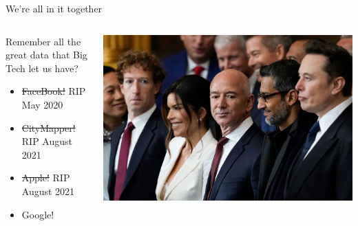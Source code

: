 \documentclass[
  ignorenonframetext,
]{beamer}
\providecommand{\tightlist}{%
  \setlength{\itemsep}{0pt}\setlength{\parskip}{0pt}}\usepackage{longtable,booktabs,array}
\begin{document}
\begin{frame}{We're all in it together}
\label{were-all-in-it-together-2}
\begin{columns}[T]
\begin{column}{0.6\textwidth}
Remember all the great data that Big Tech let us have?

\begin{itemize}
\tightlist
\item
  \st{FaceBook!} RIP May 2020
\item
  \st{CityMapper!} RIP August 2021
\item
  \st{Apple!} RIP August 2021
\item
  Google!
\end{itemize}
\end{column}

\begin{column}{0.4\textwidth}
\includegraphics{images/tech_knobs.jpeg}
\end{column}
\end{columns}
\end{frame}
\end{document}
